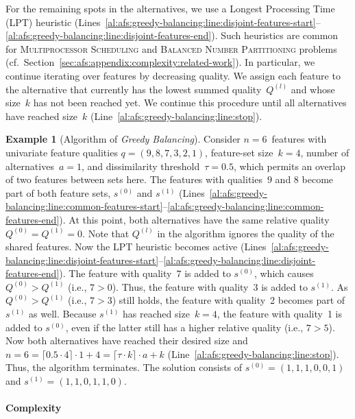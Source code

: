 \documentclass{article}
\theoremstyle{definition}
\newtheorem{example}{Example}
\begin{document}
For the remaining spots in the alternatives, we use a Longest Processing Time (LPT) heuristic (Lines~\ref{al:afs:greedy-balancing:line:disjoint-features-start}--\ref{al:afs:greedy-balancing:line:disjoint-features-end}).
Such heuristics are common for \textsc{Multiprocessor Scheduling} and \textsc{Balanced Number Partitioning} problems~\cite{babel1998thek, chen20023partitioning, lawrinenko2018reduction} (cf.~Section~\ref{sec:afs:appendix:complexity:related-work}).
In particular, we continue iterating over features by decreasing quality.
We assign each feature to the alternative that currently has the lowest summed quality~$Q^{(l)}$ and whose size~$k$ has not been reached yet.
We continue this procedure until all alternatives have reached size~$k$ (Line~\ref{al:afs:greedy-balancing:line:stop}).
%
\begin{example}[Algorithm of \emph{Greedy Balancing}]
	Consider $n=6$~features with univariate feature qualities $q = (9,8,7,3,2,1)$, feature-set size~$k=4$, number of alternatives~$a=1$, and dissimilarity threshold~$\tau = 0.5$, which permits an overlap of two features between sets here.
	The features with qualities~$9$ and $8$ become part of both feature sets, $s^{(0)}$ and $s^{(1)}$ (Lines~\ref{al:afs:greedy-balancing:line:common-features-start}--\ref{al:afs:greedy-balancing:line:common-features-end}).
	At this point, both alternatives have the same relative quality $Q^{(0)} = Q^{(1)} = 0$.
	Note that $Q^{(l)}$ in the algorithm ignores the quality of the shared features.
	Now the LPT heuristic becomes active (Lines~\ref{al:afs:greedy-balancing:line:disjoint-features-start}--\ref{al:afs:greedy-balancing:line:disjoint-features-end}).
	The feature with quality~$7$ is added to $s^{(0)}$, which causes $Q^{(0)} > Q^{(1)}$ (i.e., $7 > 0$).
	Thus, the feature with quality~3 is added to $s^{(1)}$.
	As $Q^{(0)} > Q^{(1)}$ (i.e., $7 > 3$) still holds, the feature with quality~2 becomes part of $s^{(1)}$ as well.
	Because $s^{(1)}$ has reached size~$k = 4$, the feature with quality~1 is added to $s^{(0)}$, even if the latter still has a higher relative quality (i.e., $7 > 5$).
	Now both alternatives have reached their desired size and $n = 6 = \lceil 0.5 \cdot 4 \rceil \cdot 1 + 4 = \lceil \tau \cdot k \rceil \cdot a + k$ (Line~\ref{al:afs:greedy-balancing:line:stop}).
	Thus, the algorithm terminates.
	The solution consists of $s^{(0)} = (1,1,1,0,0,1)$ and $s^{(1)} = (1,1,0,1,1,0)$.
	\label{ex:afs:greedy-balancing:algorithm}
\end{example}

\paragraph{Complexity}
\end{document}
